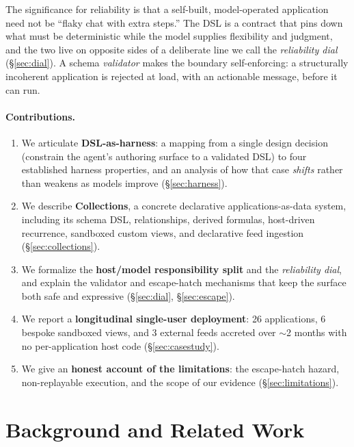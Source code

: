 \documentclass[11pt]{article}
\begin{document}
The significance for reliability is that a self-built, model-operated application
need not be ``flaky chat with extra steps.'' The DSL is a contract that pins down
what must be deterministic while the model supplies flexibility and judgment, and
the two live on opposite sides of a deliberate line we call the \emph{reliability
dial} (\S\ref{sec:dial}). A schema \emph{validator} makes the boundary
self-enforcing: a structurally incoherent application is rejected at load, with an
actionable message, before it can run.

\paragraph{Contributions.}
\begin{enumerate}
  \item We articulate \textbf{DSL-as-harness}: a mapping from a single design
  decision (constrain the agent's authoring surface to a validated DSL) to four
  established harness properties, and an analysis of how that case \emph{shifts}
  rather than weakens as models improve (\S\ref{sec:harness}).
  \item We describe \textbf{Collections}, a concrete declarative
  applications-as-data system, including its schema DSL, relationships, derived
  formulas, host-driven recurrence, sandboxed custom views, and declarative feed
  ingestion (\S\ref{sec:collections}).
  \item We formalize the \textbf{host/model responsibility split} and the
  \emph{reliability dial}, and explain the validator and escape-hatch mechanisms
  that keep the surface both safe and expressive (\S\ref{sec:dial},
  \S\ref{sec:escape}).
  \item We report a \textbf{longitudinal single-user deployment}: 26 applications,
  6 bespoke sandboxed views, and 3 external feeds accreted over $\sim$2 months
  with no per-application host code (\S\ref{sec:casestudy}).
  \item We give an \textbf{honest account of the limitations}: the escape-hatch
  hazard, non-replayable execution, and the scope of our evidence
  (\S\ref{sec:limitations}).
\end{enumerate}

\section{Background and Related Work}
\label{sec:related}
\end{document}
